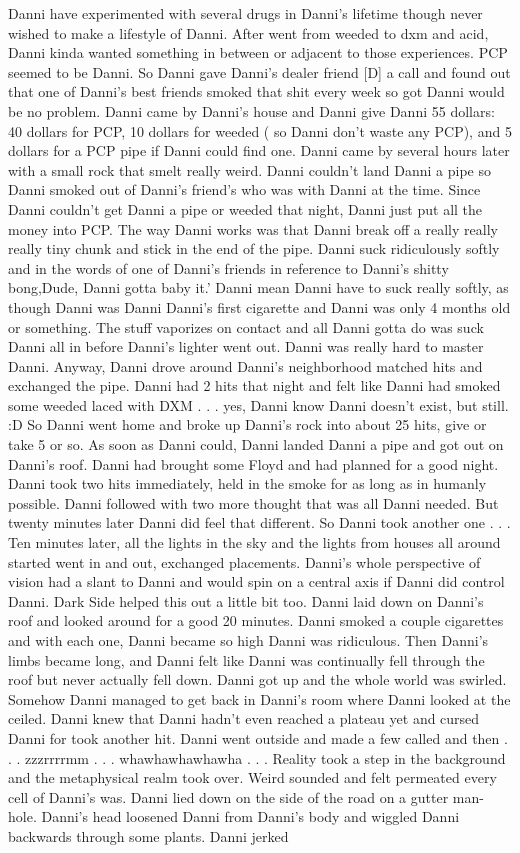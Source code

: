 \documentclass[12pt]{book}
\begin{document}
Danni have experimented with several drugs in Danni's lifetime though never wished to make a lifestyle of Danni. After went from weeded to dxm and acid, Danni kinda wanted something in between or adjacent to those experiences. PCP seemed to be Danni. So Danni gave Danni's dealer friend [D] a call and found out that one of Danni's best friends smoked that shit every week so got Danni would be no problem. Danni came by Danni's house and Danni give Danni 55 dollars: 40 dollars for PCP, 10 dollars for weeded ( so Danni don't waste any PCP), and 5 dollars for a PCP pipe if Danni could find one. Danni came by several hours later with a small rock that smelt really weird. Danni couldn't land Danni a pipe so Danni smoked out of Danni's friend's who was with Danni at the time. Since Danni couldn't get Danni a pipe or weeded that night, Danni just put all the money into PCP. The way Danni works was that Danni break off a really really really tiny chunk and stick in the end of the pipe. Danni suck ridiculously softly and in the words of one of Danni's friends in reference to Danni's shitty bong,Dude, Danni gotta baby it.' Danni mean Danni have to suck really softly, as though Danni was Danni Danni's first cigarette and Danni was only 4 months old or something. The stuff vaporizes on contact and all Danni gotta do was suck Danni all in before Danni's lighter went out. Danni was really hard to master Danni. Anyway, Danni drove around Danni's neighborhood matched hits and exchanged the pipe. Danni had 2 hits that night and felt like Danni had smoked some weeded laced with DXM . . .  yes, Danni know Danni doesn't exist, but still. :D So Danni went home and broke up Danni's rock into about 25 hits, give or take 5 or so. As soon as Danni could, Danni landed Danni a pipe and got out on Danni's roof. Danni had brought some Floyd and had planned for a good night. Danni took two hits immediately, held in the smoke for as long as in humanly possible. Danni followed with two more thought that was all Danni needed. But twenty minutes later Danni did feel that different. So Danni took another one . . .  Ten minutes later, all the lights in the sky and the lights from houses all around started went in and out, exchanged placements. Danni's whole perspective of vision had a slant to Danni and would spin on a central axis if Danni did control Danni. Dark Side helped this out a little bit too. Danni laid down on Danni's roof and looked around for a good 20 minutes. Danni smoked a couple cigarettes and with each one, Danni became so high Danni was ridiculous. Then Danni's limbs became long, and Danni felt like Danni was continually fell through the roof but never actually fell down. Danni got up and the whole world was swirled. Somehow Danni managed to get back in Danni's room where Danni looked at the ceiled. Danni knew that Danni hadn't even reached a plateau yet and cursed Danni for took another hit. Danni went outside and made a few called and then . . .  zzzrrrrmm  . . .  whawhawhawhawha . . .  Reality took a step in the background and the metaphysical realm took over. Weird sounded and felt permeated every cell of Danni's was. Danni lied down on the side of the road on a gutter man-hole. Danni's head loosened Danni from Danni's body and wiggled Danni backwards through some plants. Danni jerked 
\end{document}
